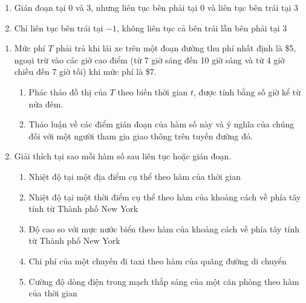 \begin{minipage}[t]{0.485\textwidth}
\begin{enumerate}[label=\textbf{\arabic*.}, leftmargin=15pt, itemsep=4pt, topsep=0pt, start=9]
\item Gián đoạn tại $0$ và $3$, nhưng liên tục bên phải tại $0$ và liên tục bên trái tại $3$

\item Chỉ liên tục bên trái tại $-1$, không liên tục cả bên trái lẫn bên phải tại $3$
\end{enumerate}

\vspace{4pt}
\noindent{\color{stewartcyan}\rule{\linewidth}{0.5pt}}
\vspace{4pt}

\begin{enumerate}[label=\textbf{\arabic*.}, leftmargin=15pt, itemsep=5pt, topsep=0pt, start=11]
\item Mức phí $T$ phải trả khi lái xe trên một đoạn đường thu phí nhất định là \$5, ngoại trừ vào các giờ cao điểm (từ 7 giờ sáng đến 10 giờ sáng và từ 4 giờ chiều đến 7 giờ tối) khi mức phí là \$7.
\begin{enumerate}[label=\textnormal{(\alph*)}, leftmargin=15pt, itemsep=2pt, topsep=2pt]
  \item Phác thảo đồ thị của $T$ theo biến thời gian $t$, được tính bằng số giờ kể từ nửa đêm.
  \item Thảo luận về các điểm gián đoạn của hàm số này và ý nghĩa của chúng đối với một người tham gia giao thông trên tuyến đường đó.
\end{enumerate}

\item Giải thích tại sao mỗi hàm số sau liên tục hoặc gián đoạn.
\begin{enumerate}[label=\textnormal{(\alph*)}, leftmargin=15pt, itemsep=2pt, topsep=2pt]
  \item Nhiệt độ tại một địa điểm cụ thể theo hàm của thời gian
  \item Nhiệt độ tại một thời điểm cụ thể theo hàm của khoảng cách về phía tây tính từ Thành phố New York
  \item Độ cao so với mực nước biển theo hàm của khoảng cách về phía tây tính từ Thành phố New York
  \item Chi phí của một chuyến đi taxi theo hàm của quãng đường di chuyển
  \item Cường độ dòng điện trong mạch thắp sáng của một căn phòng theo hàm của thời gian
\end{enumerate}
\end{enumerate}


\end{minipage}
